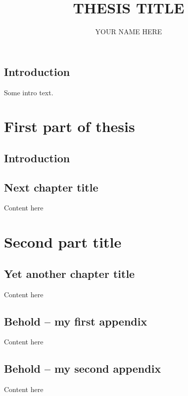 \documentclass[submit]{./thesis-umich}
\title{THESIS TITLE}
\author{YOUR NAME HERE}
\begin{document}
\acresetall %

\renewcommand\thepart{Part~\Roman{part}:} %
\renewcommand\cftpartpresnum{Part~}

\acresetall
\chapter{Introduction}
\label{ch:intro} 
Some intro text.

\part{First part of thesis}
\label{part:my_part_one_label} 


\acresetall
\chapter{Introduction}
\label{ch:p1_Introduction} 


\acresetall
\chapter{Next chapter title}
\label{ch:p1_next_chapter_label}
Content here


\acresetall
\part{Second part title}
\label{part:second_part_label} 

\acresetall
\chapter{Yet another chapter title}
\label{ch:astats}
Content here


\appendix
\begin{appendices}
  \chapter{Behold -- my first appendix}\label{ch:appendix_label}
  Content here
  \chapter{Behold -- my second appendix}\label{ch:another_appendix_label}
  Content here
\end{appendices}
\end{document}
